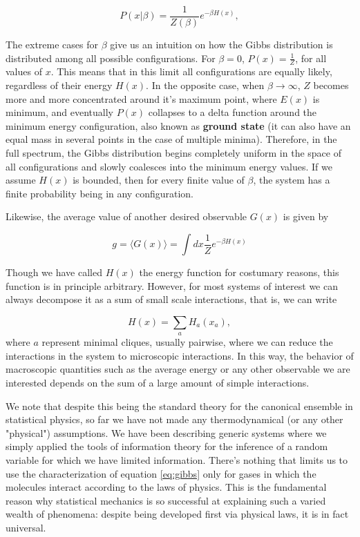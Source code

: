 \begin{equation}
\label{eq:gibbs}
    P (x | \beta) = \frac{1}{Z(\beta)} e^{-\beta H(x)},
\end{equation}

The extreme cases for $\beta$ give us an intuition on how the Gibbs distribution is distributed among all possible configurations. For $\beta = 0$, $P(x) = \frac{1}{Z}$, for all values of $x$. This means that in this limit all configurations are equally likely, regardless of their energy $H(x)$. In the opposite case, when $\beta \to \infty$, $Z$ becomes more and more concentrated around it's maximum point, where $E(x)$ is minimum, and eventually $P(x)$ collapses to a delta function around the minimum energy configuration, also known as \textbf{ground state} (it can also have an equal mass in several points in the case of multiple minima). Therefore, in the full spectrum, the Gibbs distribution begins completely uniform in the space of all configurations and slowly coalesces into the minimum energy values. If we assume $H(x)$ is bounded, then for every finite value of $\beta$, the system has a finite probability being in any configuration.

Likewise, the average value of another desired observable $G(x)$ is given by

\begin{equation}
g = \langle G(x) \rangle = \int dx \frac{1}{Z} e^{-\beta H(x)}
\end{equation}

Though we have called $H(x)$ the energy function for costumary reasons, this function is in principle arbitrary. However, for most systems of interest we can always decompose it as a sum of small scale interactions, that is, we can write

\begin{equation}
    H(x) = \sum_{a} H_a (x_a),
\end{equation}
where $a$ represent minimal cliques, usually pairwise, where we can reduce the interactions in the system to microscopic interactions. In this way, the behavior of macroscopic quantities such as the average energy or any other observable we are interested depends on the sum of a large amount of simple interactions. 



We note that despite this being the standard theory for the canonical ensemble in statistical physics, so far we have not made any thermodynamical (or any other "physical") assumptions. We have been describing generic systems where we simply applied the tools of information theory for the inference of a random variable for which we have limited information. There's nothing that limits us to use the characterization of equation \eqref{eq:gibbs} only for gases in which the molecules interact according to the laws of physics. This is the fundamental reason why statistical mechanics is so successful at explaining such a varied wealth of phenomena: despite being developed first via physical laws, it is in fact universal.

